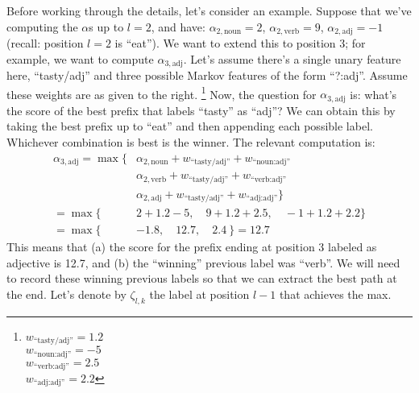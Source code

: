 Before working through the details, let's consider an example.
Suppose that we've computing the $\alpha$s up to $l=2$, and have:
$\alpha_{2,\text{noun}} = 2$,
$\alpha_{2,\text{verb}} = 9$,
$\alpha_{2,\text{adj}} = -1$ (recall: position $l=2$ is ``eat'').
We want to extend this to position $3$; for example, we want to compute $\alpha_{3,\text{adj}}$.
Let's assume there's a single unary feature here, ``tasty/adj'' and three possible Markov features of the form ``?:adj''.
Assume these weights are as given to the right.
\footnote{$w_{\text{``tasty/adj''}} = 1.2$\\
$w_{\text{``noun:adj''}} = -5$\\
$w_{\text{``verb:adj''}} = 2.5$\\
$w_{\text{``adj:adj''}} = 2.2$}
Now, the question for $\alpha_{3,\text{adj}}$ is: what's the score of the best prefix that labels ``tasty'' as ``adj''?
We can obtain this by taking the best prefix up to ``eat'' and then appending each possible label.
Whichever combination is best is the winner.
The relevant computation is:
\begin{align}
  \alpha_{3,\text{adj}} =
    \max \Big\{
      & \alpha_{2,\text{noun}} + w_{\text{``tasty/adj''}} + w_{\text{``noun:adj''}} \nonumber\\
      & \alpha_{2,\text{verb}} + w_{\text{``tasty/adj''}} + w_{\text{``verb:adj''}} \nonumber\\
      & \alpha_{2,\text{adj}}  + w_{\text{``tasty/adj''}} + w_{\text{``adj:adj''}} \Big\} \\
 = \max \Big\{ & 2+1.2-5, \quad 9+1.2+2.5, \quad -1+1.2+2.2 \Big\} \\
 = \max \Big\{ & -1.8, \quad 12.7, \quad 2.4 ~ \Big\} = 12.7
\end{align}
This means that (a) the score for the prefix ending at position 3 labeled as adjective is 12.7, and (b) the ``winning'' previous label was ``verb''. We will need to record these winning previous labels so that we can extract the best path at the end.
Let's denote by $\zeta_{l,k}$ the label at position $l-1$ that achieves the max.

